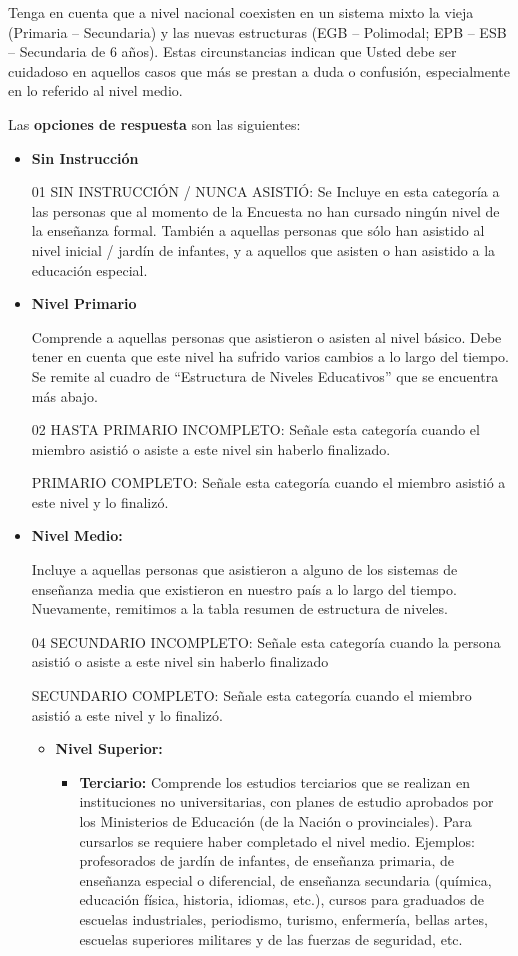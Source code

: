 \documentclass[
  openany]{book}
\begin{document}
Tenga en cuenta que a nivel nacional coexisten en un sistema mixto la vieja (Primaria -- Secundaria) y las nuevas estructuras (EGB -- Polimodal; EPB -- ESB -- Secundaria de 6 años). Estas circunstancias indican que Usted debe ser cuidadoso en aquellos casos que más se prestan a duda o confusión, especialmente en lo referido al nivel medio.

Las \textbf{opciones de respuesta} son las siguientes:

\begin{itemize}
\item
  \textbf{Sin Instrucción}

  01 SIN INSTRUCCIÓN / NUNCA ASISTIÓ: Se Incluye en esta categoría a las personas que al momento de la Encuesta no han cursado ningún nivel de la enseñanza formal. También a aquellas personas que sólo han asistido al nivel inicial / jardín de infantes, y a aquellos que asisten o han asistido a la educación especial.
\item
  \textbf{Nivel Primario}

  Comprende a aquellas personas que asistieron o asisten al nivel básico. Debe tener en cuenta que este nivel ha sufrido varios cambios a lo largo del tiempo. Se remite al cuadro de ``Estructura de Niveles Educativos'' que se encuentra más abajo.

  02 HASTA PRIMARIO INCOMPLETO: Señale esta categoría cuando el miembro asistió o asiste a este nivel sin haberlo finalizado.

  PRIMARIO COMPLETO: Señale esta categoría cuando el miembro asistió a este nivel y lo finalizó.
\item
  \textbf{Nivel Medio:}

  Incluye a aquellas personas que asistieron a alguno de los sistemas de enseñanza media que existieron en nuestro país a lo largo del tiempo. Nuevamente, remitimos a la tabla resumen de estructura de niveles.

  04 SECUNDARIO INCOMPLETO: Señale esta categoría cuando la persona asistió o asiste a este nivel sin haberlo finalizado

  SECUNDARIO COMPLETO: Señale esta categoría cuando el miembro asistió a este nivel y lo finalizó.

  \begin{itemize}
  \item
    \textbf{Nivel Superior:}

    \begin{itemize}
    \item
      \textbf{Terciario:} Comprende los estudios terciarios que se realizan en instituciones no universitarias, con planes de estudio aprobados por los Ministerios de Educación (de la Nación o provinciales). Para cursarlos se requiere haber completado el nivel medio. Ejemplos: profesorados de jardín de infantes, de enseñanza primaria, de enseñanza especial o diferencial, de enseñanza secundaria (química, educación física, historia, idiomas, etc.), cursos para graduados de escuelas industriales, periodismo, turismo, enfermería, bellas artes, escuelas superiores militares y de las fuerzas de seguridad, etc.


\end{itemize}
\end{itemize}
\end{itemize}
\end{document}
